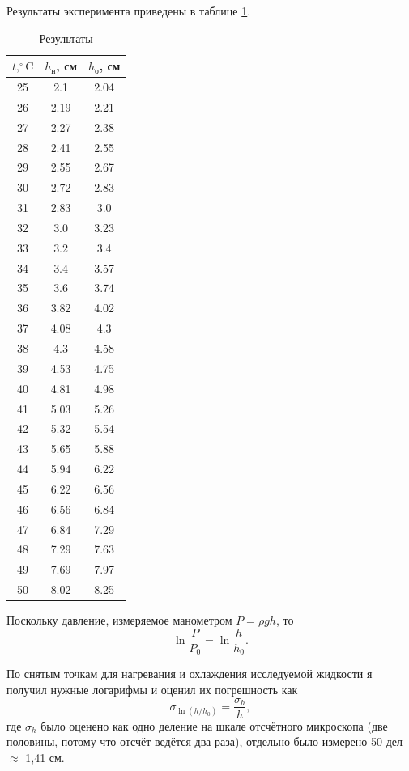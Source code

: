 \documentclass[12pt]{article}
\begin{document}
	Результаты эксперимента приведены в таблице \ref{tbl:res}.
	
	\begin{table}[!h]
	\caption{Результаты}
	\label{tbl:res}
	\begin{center}
	\begin{tabular}{|c|c|c|}
	\hline
	$t, ^\circ\text{C}$ & $h_\text{н}$, см & $h_\text{о}$, см \\
	\hline
	25 & 2.1 & 2.04 \\
	26 & 2.19 & 2.21 \\
	27 & 2.27 & 2.38 \\
	28 & 2.41 & 2.55 \\
	29 & 2.55 & 2.67 \\
	30 & 2.72 & 2.83 \\
	31 & 2.83 & 3.0 \\
	32 & 3.0 & 3.23 \\
	33 & 3.2 & 3.4 \\
	34 & 3.4 & 3.57 \\
	35 & 3.6 & 3.74 \\
	36 & 3.82 & 4.02 \\
	37 & 4.08 & 4.3 \\
	38 & 4.3 & 4.58 \\
	39 & 4.53 & 4.75 \\
	40 & 4.81 & 4.98 \\
	41 & 5.03 & 5.26 \\
	42 & 5.32 & 5.54 \\
	43 & 5.65 & 5.88 \\
	44 & 5.94 & 6.22 \\
	45 & 6.22 & 6.56 \\
	46 & 6.56 & 6.84 \\
	47 & 6.84 & 7.29 \\
	48 & 7.29 & 7.63 \\
	49 & 7.69 & 7.97 \\
	50 & 8.02 & 8.25 \\
	\hline
	\end{tabular}
	\end{center}
	\end{table}
	
	Поскольку давление, измеряемое манометром $P=\rho gh$, то $$ \ln \frac{P}{P_0} = \ln \frac{h}{h_0}. $$
	
	По снятым точкам для нагревания и охлаждения исследуемой жидкости я получил нужные логарифмы и оценил их погрешность как $$ \sigma_{\ln \left( h/h_0 \right)} = \frac{\sigma_h}{h}, $$ где $\sigma_h$ было оценено как одно деление на шкале отсчётного микроскопа (две половины, потому что отсчёт ведётся два раза), отдельно было измерено 50 дел $\approx$ 1,41 см.
	
\end{document}
